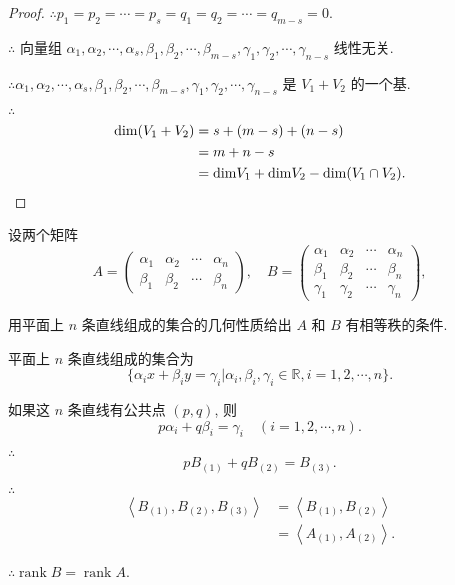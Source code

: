 \documentclass{ctexart}
\begin{document}
\begin{proof}
    $\therefore p_1=p_2=\cdots=p_s=q_1=q_2=\cdots=q_{m-s}=0$.

    $\therefore$ 向量组 $\alpha_1,\alpha_2,\cdots,\alpha_s,\beta_1,\beta_2,\cdots,\beta_{m-s},\gamma_1,\gamma_2,\cdots,\gamma_{n-s}$ 线性无关.

    $\therefore\alpha_1,\alpha_2,\cdots,\alpha_s,\beta_1,\beta_2,\cdots,\beta_{m-s},\gamma_1,\gamma_2,\cdots,\gamma_{n-s}$ 是 $V_1+V_2$ 的一个基.

    $\therefore$
    \begin{align*}
        \mathrm{dim}(V_1+V_2) & =s+(m-s)+(n-s) \\
        & =m+n-s \\
        & =\mathrm{dim}V_1+\mathrm{dim}V_2-\mathrm{dim}(V_1\cap V_2).\qedhere
    \end{align*}
\end{proof}
\begin{exercise}[2.4]
    设两个矩阵
    \[A=\begin{pmatrix}
        \alpha_1 & \alpha_2 & \cdots & \alpha_n \\
        \beta_1 &  \beta_2 & \cdots &  \beta_n
    \end{pmatrix},\quad B=\begin{pmatrix}
        \alpha_1 & \alpha_2 & \cdots & \alpha_n \\
        \beta_1 &  \beta_2 & \cdots &  \beta_n \\
        \gamma_1 & \gamma_2 & \cdots & \gamma_n
    \end{pmatrix},\]

    用平面上 $n$ 条直线组成的集合的几何性质给出 $A$ 和 $B$ 有相等秩的条件.
\end{exercise}
\begin{solution}
    平面上 $n$ 条直线组成的集合为
    \[\{\alpha_ix+\beta_iy=\gamma_i|\alpha_i,\beta_i,\gamma_i\in\mathbb{R},i=1,2,\cdots,n\}.\]

    如果这 $n$ 条直线有公共点 $(p,q)$, 则
    \[p\alpha_i+q\beta_i=\gamma_i\quad(i=1,2,\cdots,n).\]

    $\therefore$
    \[pB_{(1)}+qB_{(2)}=B_{(3)}.\]

    $\therefore$
    \begin{align*}
        \left<B_{(1)},B_{(2)},B_{(3)}\right> & =\left<B_{(1)},B_{(2)}\right> \\
        & =\left<A_{(1)},A_{(2)}\right>.
    \end{align*}

    $\therefore\operatorname{rank}B=\operatorname{rank}A$.
\end{solution}
\end{document}
